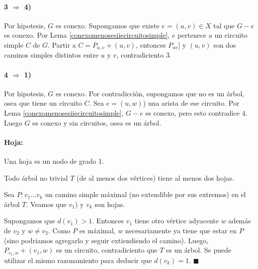 \begin{demoPart}	
	\paragraph{3 \(\Rightarrow\) 4)} Por hipotesis, \(G\) es conexo. Supongamos que existe \(e=(u,v)\in X\) tal que \(G - e\) es conexo. Por Lema \ref{conexomenosesiiecircuitosimple}, \(e\) pertenece a un circuito simple \(C\) de \(G\). Partir a \(C = P_{u,v} + (u,v)\), entonces \(P_{uv}]\) y \((u,v)\) son dos caminos simples distintos entre \(u\) y \(v\), contradiciento \(3\).
	
	\paragraph{4 \(\Rightarrow\) 1)} Por hipotesis, \(G\) es conexo. Por contradicción, supongamos que no es un árbol, osea que tiene un circuito \(C\). Sea \(e=(u,w)\)) una arista de ese circuito. Por Lema \ref{conexomenosesiiecircuitosimple}, \(G - e\) es conexo, pero esto contradice \(4\). Luego \(G\) es conexo y sin circuitos, osea es un árbol.
\end{demoPart}

\paragraph{Hoja:} Una hoja es un nodo de grado 1.

\begin{lema}\label{arboldoshojas}
	Todo árbol no trivial \(T\) (de al menos dos vértices) tiene al menos dos hojas.
\end{lema}
\begin{demo}
	Sea \(P: v_1\dots v_k\) un camino simple máximal (no extendible por sus extremos) en el árbol \(T\). Veamos que \(v_1\)) y \(v_k\) son hojas. 	
	
	Supongamos que \(d(v_1) > 1\). Entonces \(v_1\) tiene otro vértice adyacente
	 \(w\) además de \(v_2\) y \(w \neq v_2\). Como \(P\) es máximal, \(w\)
	  necesariamente ya tiene que estar en \(P\) (sino podriamos agregarlo y seguir extiendiendo el
	 camino).
	 Luego, \(P_{v_1,w} + (v_1, w)\) es un circuito, contradiciento que \(T\) es un árbol.
	Se puede utilizar el mismo razonamiento para deducir que \(d(v_k) = 1\). \(\blacksquare\)
\end{demo}

